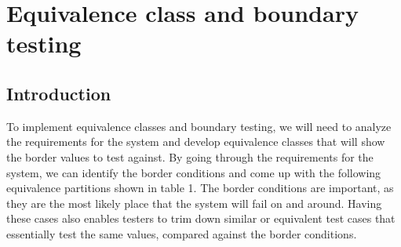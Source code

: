 \documentclass[12pt,letterpaper]{article}
\begin{document}
\section{Equivalence class and boundary testing}

\subsection{Introduction}
To implement equivalence classes and boundary testing, we will need to analyze the requirements
for the system and develop equivalence classes that will show the border values to test against. By going through the requirements for the system, we can identify the border conditions and come up with the following equivalence partitions shown in table 1.
The border conditions are important, as they are the most likely place that the system will fail on and around.  Having these cases also enables testers to trim down similar or equivalent test cases that essentially test the same values, compared against the border conditions.
\end{document}
